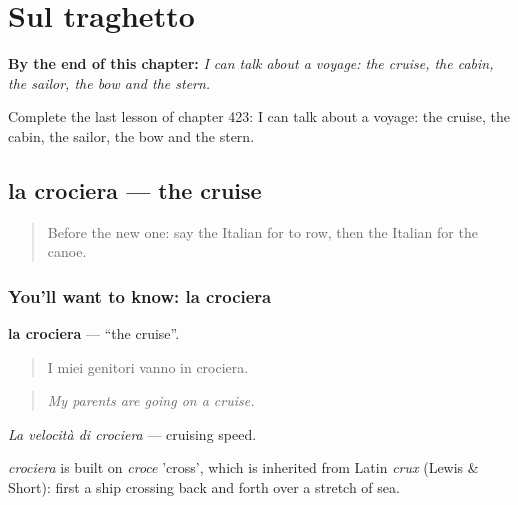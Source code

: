 
\chapter{Sul traghetto}
\label{ch:it-sul-traghetto}

\begin{chapteropening}
\textbf{By the end of this chapter:} \emph{I can talk about a voyage: the cruise, the cabin, the sailor, the bow and the stern.}

Complete the last lesson of chapter 423: I can talk about a voyage: the cruise, the cabin, the sailor, the bow and the stern.
\end{chapteropening}

\section[la crociera]{la crociera — the cruise}

\label{lesson:IT-C423-crociera}



\begin{quote}
Before the new one: say the Italian for to row, then the Italian for the canoe.
\end{quote}

\subsection*{You'll want to know: la crociera}
\textbf{la crociera} — \textquotedblleft{}the cruise\textquotedblright{}.

\begin{quote}
I miei genitori vanno in crociera.
\end{quote}

\begin{quote}
\emph{My parents are going on a cruise.}
\end{quote}

\emph{La velocità di crociera} — cruising speed.

\begin{cousinweb}
\emph{crociera} is built on \emph{croce} 'cross', which is inherited from Latin \emph{crux} (Lewis \& Short): first a ship crossing back and forth over a stretch of sea.
\end{cousinweb}

